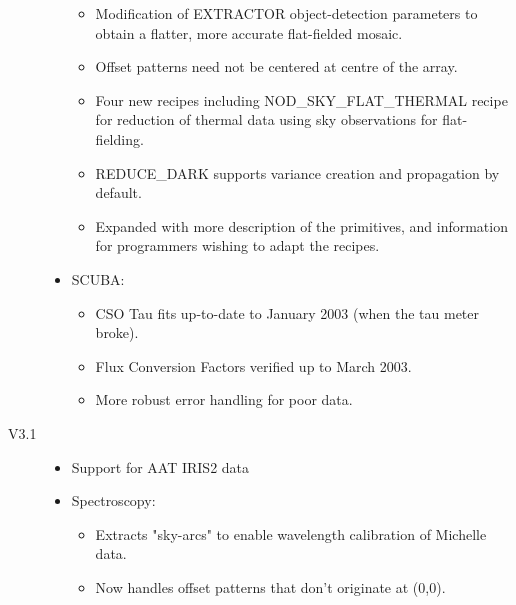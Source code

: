 \documentclass[twoside,11pt,nolof]{starlink}
\begin{document}
\begin{description}
\begin{itemize}
\begin{itemize}
\item Modification of EXTRACTOR object-detection parameters to obtain a
    flatter, more accurate flat-fielded mosaic.

\item Offset patterns need not be centered at centre of the array.

\item Four new recipes including NOD\_SKY\_FLAT\_THERMAL recipe for reduction
    of thermal data using sky observations for flat-fielding.

\item REDUCE\_DARK supports variance creation and propagation by default.

\item Expanded  with more description of the
  primitives, and information for programmers wishing to adapt the recipes.

\end{itemize}

\item SCUBA:

\begin{itemize}

\item CSO Tau fits up-to-date to January 2003 (when the tau meter broke).

\item Flux Conversion Factors verified up to March 2003.

\item More robust error handling for poor data.

\end{itemize}

\end{itemize}

\item[V3.1]

\begin{itemize}

\item Support for AAT IRIS2 data

\item Spectroscopy:

\begin{itemize}

\item Extracts "sky-arcs" to enable wavelength calibration of Michelle data.

\item Now handles offset patterns that don't originate at (0,0).


\end{itemize}
\end{itemize}
\end{description}
\end{document}
